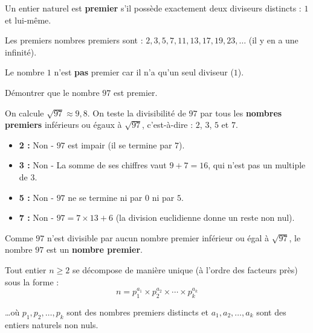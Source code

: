 \begin{defin}
	Un entier naturel est \textbf{premier} s'il possède exactement deux diviseurs distincts : $1$ et lui-même.
\end{defin}

\begin{ex}
	Les premiers nombres premiers sont : $2, 3, 5, 7, 11, 13, 17, 19, 23, \ldots$ (il y en a une infinité).

\end{ex}

\begin{rem}
	Le nombre $1$ n'est \textbf{pas} premier car il n'a qu'un seul diviseur ($1$).
\end{rem}

\begin{methode}
	Démontrer que le nombre $97$ est premier.

	\begin{correction}
		On calcule $\sqrt{97} \approx 9{,}8$. On teste la divisibilité de $97$ par tous les \textbf{nombres premiers} inférieurs ou égaux à $\sqrt{97}$, c'est-à-dire : $2$, $3$, $5$ et $7$.

		\begin{itemize}
			\item \textbf{2 :} Non - $97$ est impair (il se termine par $7$).
			\item \textbf{3 :} Non - La somme de ses chiffres vaut $9 + 7 = 16$, qui n'est pas un multiple de $3$.
			\item \textbf{5 :} Non - $97$ ne se termine ni par $0$ ni par $5$.
			\item \textbf{7 :} Non - $97 = 7 \times 13 + 6$ (la division euclidienne donne un reste non nul).
		\end{itemize}

		Comme $97$ n'est divisible par aucun nombre premier inférieur ou égal à $\sqrt{97}$, le nombre $97$ est un \textbf{nombre premier}.
	\end{correction}
\end{methode}

\begin{prop}
	Tout entier $n \geqslant 2$ se décompose de manière unique (à l'ordre des facteurs près) sous la forme :
	\[
		n = p_1^{a_1} \times p_2^{a_2} \times \cdots \times p_k^{a_k}
	\]

	\ldots où $p_1, p_2, \ldots, p_k$ sont des nombres premiers distincts et $a_1, a_2, \ldots, a_k$ sont des entiers naturels non nuls.
\end{prop}

